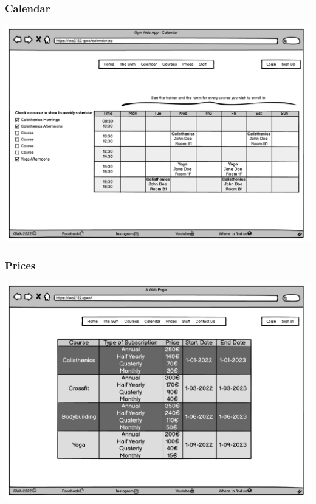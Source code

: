 \subsubsection{Calendar}
\includegraphics[width=\columnwidth]{InterfaceMockup/Calendar.pdf}

\subsubsection{Prices}
\includegraphics[width=\columnwidth]{InterfaceMockup/Prices/prices_page.pdf}

